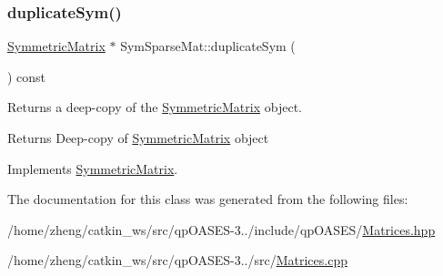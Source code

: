 \subsubsection{\texorpdfstring{duplicate\+Sym()}{duplicateSym()}}
{\footnotesize\ttfamily \hyperlink{class_symmetric_matrix}{Symmetric\+Matrix} $\ast$ Sym\+Sparse\+Mat\+::duplicate\+Sym (\begin{DoxyParamCaption}{ }\end{DoxyParamCaption}) const\hspace{0.3cm}{\ttfamily [virtual]}}

Returns a deep-\/copy of the \hyperlink{class_symmetric_matrix}{Symmetric\+Matrix} object. \begin{DoxyReturn}{Returns}
Deep-\/copy of \hyperlink{class_symmetric_matrix}{Symmetric\+Matrix} object 
\end{DoxyReturn}


Implements \hyperlink{class_symmetric_matrix_a4dacd5fe6d12b5082a90a7336669fce7}{Symmetric\+Matrix}.



The documentation for this class was generated from the following files\+:\begin{DoxyCompactItemize}
\item 
/home/zheng/catkin\+\_\+ws/src/qp\+O\+A\+S\+E\+S-\/3../include/qp\+O\+A\+S\+E\+S/\hyperlink{_matrices_8hpp}{Matrices.\+hpp}\item 
/home/zheng/catkin\+\_\+ws/src/qp\+O\+A\+S\+E\+S-\/3../src/\hyperlink{_matrices_8cpp}{Matrices.\+cpp}\end{DoxyCompactItemize}
